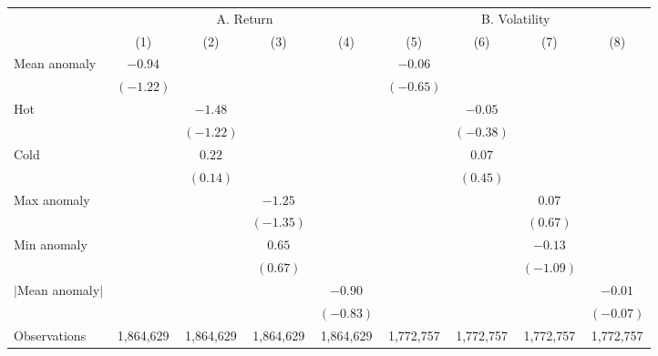 \begin{tabular}{@{}lcccccccc@{}}
\toprule
 & \multicolumn{4}{c}{A. Return} & \multicolumn{4}{c}{B. Volatility} \\
\cmidrule(lr){2-5}\cmidrule(lr){6-9}
 & (1) & (2) & (3) & (4) & (5) & (6) & (7) & (8) \\
\midrule
Mean anomaly & $-0.94$ &  &  &  & $-0.06$ &  &  &  \\
 & $(-1.22)$ &  &  &  & $(-0.65)$ &  &  &  \\
Hot &  & $-1.48$ &  &  &  & $-0.05$ &  &  \\
 &  & $(-1.22)$ &  &  &  & $(-0.38)$ &  &  \\
Cold &  & $0.22$ &  &  &  & $0.07$ &  &  \\
 &  & $(0.14)$ &  &  &  & $(0.45)$ &  &  \\
Max anomaly &  &  & $-1.25$ &  &  &  & $0.07$ &  \\
 &  &  & $(-1.35)$ &  &  &  & $(0.67)$ &  \\
Min anomaly &  &  & $0.65$ &  &  &  & $-0.13$ &  \\
 &  &  & $(0.67)$ &  &  &  & $(-1.09)$ &  \\
$|$Mean anomaly$|$ &  &  &  & $-0.90$ &  &  &  & $-0.01$ \\
 &  &  &  & $(-0.83)$ &  &  &  & $(-0.07)$ \\
\midrule
Observations & 1,864,629 & 1,864,629 & 1,864,629 & 1,864,629 & 1,772,757 & 1,772,757 & 1,772,757 & 1,772,757 \\
\bottomrule
\end{tabular}

